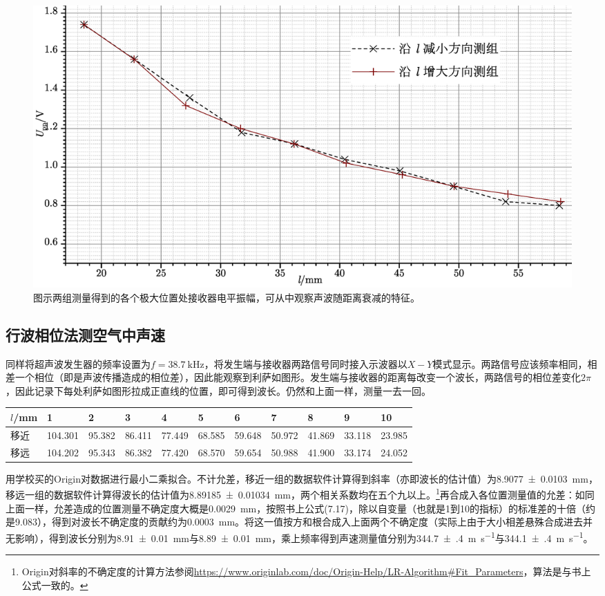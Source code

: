 \documentclass[UTF8]{ctexart}
\begin{document}
\begin{figure}
  \centering
  \includegraphics[width=\linewidth]{Upp.eps}
  \caption{图示两组测量得到的各个极大位置处接收器电平振幅，可从中观察声波随距离衰减的特征。}
\end{figure}


\subsection{行波相位法测空气中声速}
同样将超声波发生器的频率设置为$f=\SI{38.7}{\kHz}$，将发生端与接收器两路信号同时接入示波器以$X-Y$模式显示。两路信号应该频率相同，相差一个相位（即是声波传播造成的相位差），因此能观察到利萨如图形。发生端与接收器的距离每改变一个波长，两路信号的相位差变化$2\pi$，因此记录下每处利萨如图形拉成正直线的位置，即可得到波长。仍然和上面一样，测量一去一回。
\begin{center}
\begin{tabu}{X[c]X[c]X[c]X[c]X[c]X[c]X[c]X[c]X[c]X[c]X[c]}
\hline
$l$/mm	&1&2&3&4&5&6&7&8&9&10
\\
\hline
移近&104.301 	&95.382 	&86.411 	&77.449 	&68.585 	&59.648 	&50.972 	&41.869 	&33.118 	&23.985 \\
移远&104.202 	&95.343 	&86.382 	&77.420 	&68.570 	&59.654 	&50.988 	&41.900 	&33.174 	&24.052 \\
\hline
\end{tabu}
\end{center}
用学校买的Origin对数据进行最小二乘拟合。不计允差，移近一组的数据软件计算得到斜率（亦即波长的估计值）为\SI{8.9077(103)}{\mm}，移远一组的数据软件计算得波长的估计值为\SI{8.89185(1034)}{\mm}，两个相关系数均在五个九以上。\footnote{Origin对斜率的不确定度的计算方法参阅\url{https://www.originlab.com/doc/Origin-Help/LR-Algorithm\#Fit_Parameters}，算法是与书上公式一致的。}再合成入各位置测量值的允差：如同上面一样，允差造成的位置测量不确定度大概是\SI{.0029}{\mm}，按照书上公式(7.17)，除以自变量（也就是1到10的指标）的标准差的十倍（约是\num{9.083}），得到对波长不确定度的贡献约为\SI{.0003}{\mm}。将这一值按方和根合成入上面两个不确定度（实际上由于大小相差悬殊合成进去并无影响），得到波长分别为\SI{8.91(1)}{\mm}与\SI{8.89(1)}{\mm}，乘上频率得到声速测量值分别为\SI{344.7(4)}{\meter\per\second}与\SI{344.1(4)}{\meter\per\second}。
\end{document}
